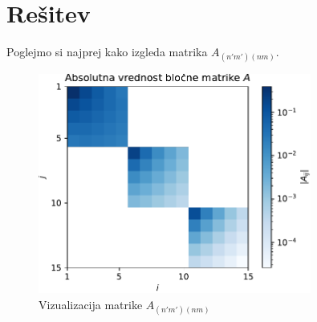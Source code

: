 \section{Rešitev}
Poglejmo si najprej kako izgleda matrika $A_{(n'm')(nm)}$.
\begin{figure}[h]
    \centering
    \includegraphics[width=0.8\textwidth]{pdf/A.pdf}
    \caption{Vizualizacija matrike $A_{(n'm')(nm)}$}
\end{figure}

